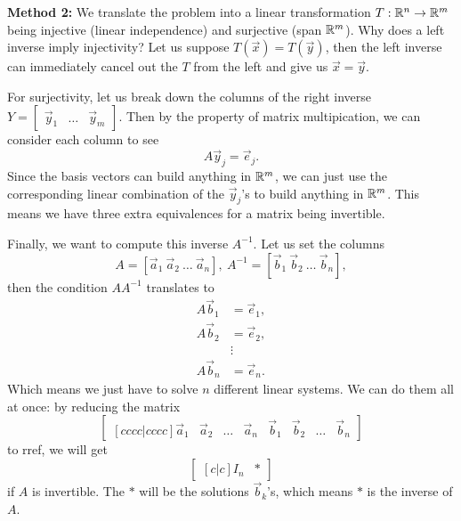 \textbf{Method 2:}
We translate the problem into a linear transformation $T:\mathbb{R}^n\to\mathbb{R}^m$ being injective (linear independence) and surjective (span $\mathbb{R}^m$).
Why does a left inverse imply injectivity? Let us suppose $T(\vec{x})=T(\vec{y})$, then the left inverse can immediately cancel out the $T$ from the left and give us $\vec{x}=\vec{y}$.

For surjectivity, let us break down the columns of the right inverse $Y=\begin{bmatrix}
    \vec{y}_1 & \ldots &\vec{y}_m
\end{bmatrix}$.
Then by the property of matrix multipication, we can consider each column to see \[
A\vec{y}_j = \vec{e}_j.
\]
Since the basis vectors can build anything in $\mathbb{R}^m$, we can just use the corresponding linear combination of the $\vec{y}_j$'s to build anything in $\mathbb{R}^m$.
This means we have three extra equivalences for a matrix being invertible.


Finally, we want to compute this inverse $A^{-1}$. Let us set the columns \[
A=[\vec{a}_1 \ \vec{a}_2 \ \ldots \ \vec{a}_n],\ 
A^{-1}=[\vec{b}_1 \ \vec{b}_2 \ \ldots \ \vec{b}_n],
\] 
then the condition $AA^{-1}$ translates to \begin{align*}
	A\vec{b}_1&=\vec{e}_1,\\
	A\vec{b}_2&=\vec{e}_2,\\
	&\vdots \\
	A\vec{b}_n&=\vec{e}_n.
\end{align*}
Which means we just have to solve $n$ different linear systems. We can do them all at once: by reducing the matrix \[
\begin{bmatrix}[cccc|cccc]
	\vec{a}_1 & \vec{a}_2 & \ldots &\vec{a}_n
	&\vec{b}_1 & \vec{b}_2 & \ldots &\vec{b}_n
\end{bmatrix}
\]
to rref,
we will get \[
\begin{bmatrix}[c|c]
	I_n & *
\end{bmatrix}
\]
if $A$ is invertible. The $*$ will be the solutions $\vec{b}_k$'s, which means $*$ is the inverse of $A$.

